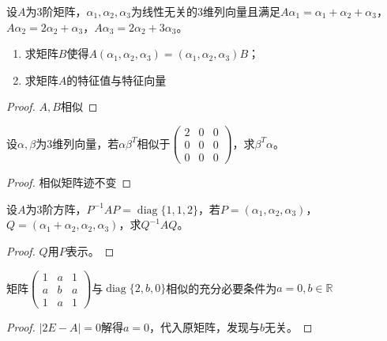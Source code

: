 \begin{theorem}
	设$A$为$3$阶矩阵，$\alpha_1,\alpha_2,\alpha_3$为线性无关的$3$维列向量且满足$A\alpha_1=\alpha_1+\alpha_2+\alpha_3$，$A\alpha_2=2\alpha_2+\alpha_3$，$A\alpha_3=2\alpha_2+3\alpha_3$。
	\begin{enumerate}
		\item 求矩阵$B$使得$A(\alpha_1,\alpha_2,\alpha_3)=(\alpha_1,\alpha_2,\alpha_3)B$；
		\item 求矩阵$A$的特征值与特征向量
	\end{enumerate}
\end{theorem}
\begin{proof}
	$A,B$相似
\end{proof}

\begin{theorem}
	设$\alpha,\beta$为$3$维列向量，若$\alpha\beta^T$相似于$
	\begin{pmatrix}
		2 & 0 & 0 \\
		0 & 0 & 0 \\
		0 & 0 & 0
	\end{pmatrix}$，求$\beta^T\alpha$。
\end{theorem}
\begin{proof}
	相似矩阵迹不变
\end{proof}

\begin{theorem}
	设$A$为$3$阶方阵，$P^{-1}AP=\operatorname{diag}\{1,1,2\}$，若$P=(\alpha_1,\alpha_2,\alpha_3)$，$Q=(\alpha_1+\alpha_2,\alpha_2,\alpha_3)$，求$Q^{-1}AQ$。
\end{theorem}
\begin{proof}
	$Q$用$P$表示。
\end{proof}

\begin{theorem}
	矩阵$\begin{pmatrix}
		1 & a & 1 \\
		a & b & a \\
		1 & a & 1
	\end{pmatrix}$与$\operatorname{diag}\{2,b,0\}$相似的充分必要条件为$a=0,b\in\mathbb{R}^{}$
\end{theorem}
\begin{proof}
	$|2E-A|=0$解得$a=0$，代入原矩阵，发现与$b$无关。
\end{proof}

